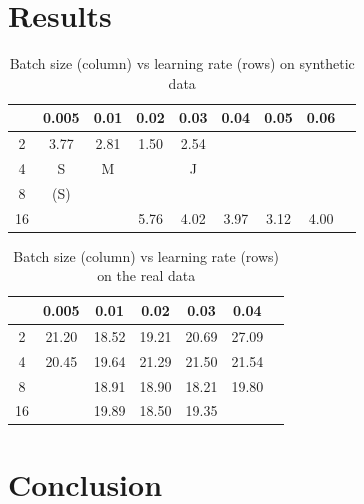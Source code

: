 \documentclass[10pt,conference]{IEEEtran}
\begin{document}
\section{Results}
\begin{table}
    \centering
    \begin{tabular}{|c || c | c | c | c | c | c| c | c |} 
        \hline
         & 0.005 & 0.01 & 0.02 & 0.03 & 0.04 & 0.05 & 0.06 \\  
        \hline\hline
        2 & 3.77 & 2.81 & 1.50 & 2.54 &  &  &\\ 
        \hline
        4 & S & M &  & J &  &  &\\
        \hline
        8 & (S) &  &  &  &  &  &\\
        \hline
        16 &  &  & 5.76 & 4.02 & 3.97 & 3.12 & 4.00\\
        \hline
    \end{tabular}
    \caption{Batch size (column) vs learning rate (rows) on synthetic data}
\end{table}

\begin{table}
    \centering
     \begin{tabular}{|c || c | c | c | c | c | c| } 
     \hline
       & 0.005 & 0.01 & 0.02 & 0.03 & 0.04 \\  
     \hline\hline
     2 & 21.20 & 18.52 &  19.21 &  20.69 & 27.09\\ 
     \hline
     4 & 20.45 & 19.64 & 21.29 &  21.50 & 21.54 \\
     \hline
     8 &  & 18.91 & 18.90 &  18.21 & 19.80 \\
     \hline
     16 &  & 19.89 & 18.50 &  19.35 & \\
     \hline
    \end{tabular}
    \caption{Batch size (column) vs learning rate (rows) on the real data}
\end{table}


\section{Conclusion}



\end{document}
